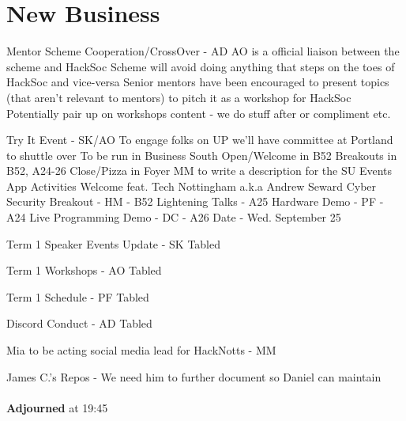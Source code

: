 \documentclass[11pt]{meetingmins}
\begin{document}
\section{New Business}
\begin{items}
	\item Mentor Scheme Cooperation/CrossOver - AD
		\subitem AO is a official liaison between the scheme and HackSoc
		\subitem Scheme will avoid doing anything that steps on the toes of HackSoc and vice-versa
		\subitem Senior mentors have been encouraged to present topics (that aren't relevant to mentors) to pitch it as a workshop for HackSoc
		\subitem Potentially pair up on workshops content - we do stuff after or compliment etc.
	\item Try It Event - SK/AO
		\subitem To engage folks on UP we'll have committee at Portland to shuttle over
		\subitem To be run in Business South
		\subitem Open/Welcome in B52
		\subitem Breakouts in B52, A24-26
		\subitem Close/Pizza in Foyer
		\subitem MM to write a description for the SU Events App
		\subitem Activities
			\subsubitem Welcome feat. Tech Nottingham a.k.a Andrew Seward
			\subsubitem Cyber Security Breakout - HM - B52
			\subsubitem Lightening Talks - A25
			\subsubitem Hardware Demo - PF - A24
			\subsubitem Live Programming Demo - DC - A26
		\subitem Date - Wed. September 25
	\item Term 1 Speaker Events Update - SK
		\subitem Tabled
	\item Term 1 Workshops - AO
		\subitem Tabled
	\item Term 1 Schedule - PF
		\subitem Tabled
	\item Discord Conduct - AD
		\subitem Tabled
	\item Mia to be acting social media lead for HackNotts - MM
	\item James C.'s Repos - We need him to further document so Daniel can maintain
	\\\\ \textbf{Adjourned} at 19:45
\end{items}

\vspace{1em}
\end{document}
